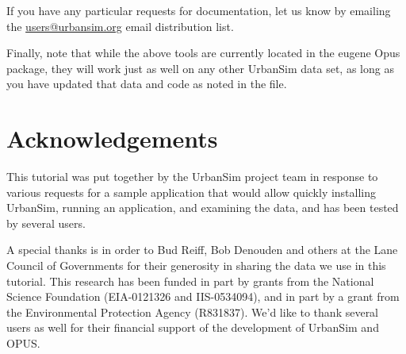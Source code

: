 \documentclass{howto}
\begin{document}
If you have any particular requests for documentation, let us know by emailing
the \url{users@urbansim.org} email distribution list.

Finally, note that while the above tools are currently located in the eugene
Opus package, they will work just as well on any other UrbanSim data set, as
long as you have updated that data and code as noted in the
 file.

\section*{Acknowledgements}

This tutorial was put together by the UrbanSim project team in
response to various requests for a sample application that would
allow quickly installing UrbanSim, running an application, and
examining the data, and has been tested by several users.

A special thanks is in order to Bud Reiff, Bob Denouden and others at the
Lane Council of Governments for their generosity in sharing the data we use
in this tutorial.  This research has been funded in part by grants from the
National Science Foundation (EIA-0121326 and IIS-0534094), and in part by a
grant from the Environmental Protection Agency (R831837).  We'd like
to thank several users as well for their financial support of the
development of UrbanSim and OPUS.
\end{document}
